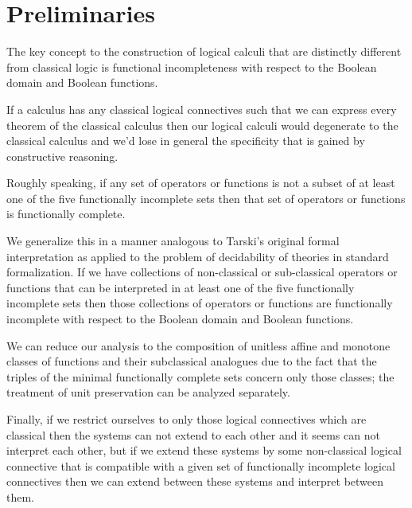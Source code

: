 \part{Preliminaries}
\begin{center}
	\begin{flushleft}
		The key concept to the construction of logical calculi that are distinctly different from classical logic is functional incompleteness with respect to the Boolean domain and Boolean functions.
	\end{flushleft}
	\begin{flushleft}
		If a calculus has any classical logical connectives such that we can express every theorem of the classical calculus then our logical calculi would degenerate to the classical calculus and we'd lose in general the specificity that is gained by constructive reasoning.
	\end{flushleft}
	\begin{flushleft}
		Roughly speaking, if any set of operators or functions is not a subset of at least one of the five functionally incomplete sets then that set of operators or functions is functionally complete.
	\end{flushleft}
	\begin{flushleft}
		We generalize this in a manner analogous to Tarski's original formal interpretation as applied to the problem of decidability of theories in standard formalization. If we have collections of non-classical or sub-classical operators or functions that can be interpreted in at least one of the five functionally incomplete sets then those collections of operators or functions are functionally incomplete with respect to the Boolean domain and Boolean functions.
	\end{flushleft}
	\begin{flushleft}
	We can reduce our analysis to the composition of unitless affine and monotone classes of functions and their subclassical analogues due to the fact that the triples of the minimal functionally complete sets concern only those classes; the treatment of unit preservation can be analyzed separately.
	\end{flushleft}
	\begin{flushleft}
		Finally, if we restrict ourselves to only those logical connectives which are classical then the systems can not extend to each other and it seems can not interpret each other, but if we extend these systems by some non-classical logical connective that is compatible with a given set of functionally incomplete logical connectives then we can extend between these systems and interpret between them.
	\end{flushleft}

\end{center}
